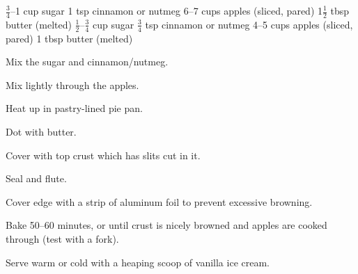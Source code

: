 \dishtype{\dessert}
\dishother{\vegetarian}
\begin{ingreds}
        $\frac{3}{4}$--1 cup sugar
        1 tsp cinnamon or nutmeg
        6--7 cups apples (sliced, pared)
        1$\frac{1}{2}$ tbsp butter (melted)
        $\frac{1}{2}$--$\frac{3}{4}$ cup sugar
        $\frac{3}{4}$ tsp cinnamon or nutmeg
        4--5 cups apples (sliced, pared)
        1 tbsp butter (melted)
\end{ingreds}
\begin{method}
    Mix the sugar and cinnamon/nutmeg.\par
    Mix lightly through the apples.\par
    Heat up in pastry-lined pie pan.\par
    Dot with butter.\par
    Cover with top crust which has slits cut in it.\par
    Seal and flute.\par
    Cover edge with a strip of aluminum foil to prevent excessive browning.\par
    Bake 50--60 minutes, or until crust is nicely browned and apples are cooked through (test with a fork).\par
    Serve warm or cold with a heaping scoop of vanilla ice cream.    
\end{method}